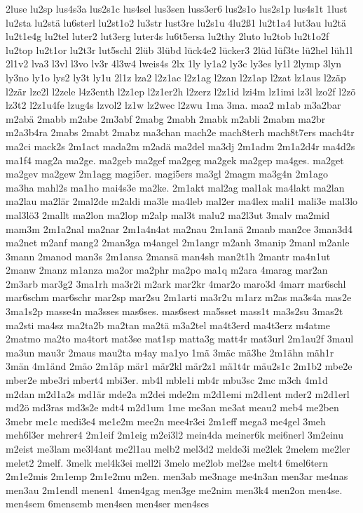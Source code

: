 {2luse
lu2sp
lus4s3a
lus2s1c
lus4sel
lus3sen
luss3er6
lus2s1o
lus2s1p
lus4s1t
1lust
lu2sta
lu2stä
lu6sterl
lu2st1o2
lu3str
lust3re
lu2s1u
4lu2ß1
lu2t1a4
lut3au
lu2tä
lu2t1e4g
lu2tel
luter2
lut3erg
luter4s
lu6t5ersa
lu2thy
2luto
lu2tob
lu2t1o2f
lu2top
lu2t1or
lu2t3r
lut5schl
2lüb
3lübd
lück4e2
lücker3
2lüd
lüf3te
lü2hel
lüh1l
2l1v2
lva3
l3vl
l3vo
lv3r
4l3w4
lweis4s
2lx
1ly
ly1a2
ly3c
ly3es
ly1l
2lymp
3lyn
ly3no
ly1o
lys2
ly3t
ly1u
2l1z
lza2
l2z1ac
l2z1ag
l2zan
l2z1ap
l2zat
lz1aus
l2zäp
l2zär
lze2l
l2zele
l4z3enth
l2z1ep
l2z1er2h
l2zerz
l2z1id
lzi4m
lz1imi
lz3l
lzo2f
l2zö
lz3t2
l2z1u4fe
lzug4s
lzvol2
lz1w
lz2wec
l2zwu
1ma
3ma.
maa2
m1ab
m3a2bar
m2abä
2mabb
m2abe
2m3abf
2mabg
2mabh
2mabk
m2abli
2mabm
ma2br
m2a3b4ra
2mabs
2mabt
2mabz
ma3chan
mach2e
mach8terh
mach8t7ers
mach4tr
ma2ci
mack2s
2m1act
mada2m
m2adä
ma2del
ma3dj
2m1adm
2m1a2d4r
ma4d2s
ma1f4
mag2a
ma2ge.
ma2geb
ma2gef
ma2geg
ma2gek
ma2gep
ma4ges.
ma2get
ma2gev
ma2gew
2m1agg
magi5er.
magi5ers
ma3gl
2magm
ma3g4n
2m1ago
ma3ha
mahl2s
ma1ho
mai4s3e
ma2ke.
2m1akt
mal2ag
mal1ak
ma4lakt
ma2lan
ma2lau
ma2lär
2mal2de
m2aldi
ma3le
ma4leb
mal2er
ma4lex
mali1
mali3e
mal3lo
mal3lö3
2mallt
ma2lon
ma2lop
m2alp
mal3t
malu2
ma2l3ut
3malv
ma2mid
mam3m
2m1a2nal
ma2nar
2m1a4n4at
ma2nau
2m1anä
2manb
man2ce
3man3d4
ma2net
m2anf
mang2
2man3ga
m4angel
2m1angr
m2anh
3manip
2manl
m2anle
3mann
2manod
man3s
2m1ansa
2mansä
man4sh
man2t1h
2mantr
ma4n1ut
2manw
2manz
m1anza
ma2or
ma2phr
ma2po
ma1q
m2ara
4marag
mar2an
2m3arb
mar3g2
3ma1rh
ma3r2i
m2ark
mar2kr
4mar2o
maro3d
4marr
mar6schl
mar6schm
mar6schr
mar2sp
mar2su
2m1arti
ma3r2u
m1arz
m2as
ma3s4a
mas2e
3ma1s2p
masse4n
ma3sses
mas6ses.
mas6sest
ma5sset
mass1t
ma3s2su
3mas2t
ma2sti
ma4sz
ma2ta2b
ma2tan
ma2tä
m3a2tel
ma4t3erd
ma4t3erz
m4atme
2matmo
ma2to
ma4tort
mat3se
mat1sp
matta3g
matt4r
mat3url
2m1au2f
3maul
ma3un
mau3r
2maus
mau2ta
m4ay
ma1yo
1mä
3mäc
mä3he
2m1ähn
mäh1r
3män
4m1änd
2mäo
2m1äp
mär1
mär2kl
mär2z1
mä1t4r
mäu2s1c
2m1b2
mbe2e
mber2e
mbe3ri
mbert4
mbi3er.
mb4l
mble1i
mb4r
mbu3sc
2mc
m3ch
4m1d
m2dan
m2d1a2s
md1är
mde2a
m2dei
mde2m
m2d1emi
m2d1ent
mder2
m2d1erl
md2ö
md3ras
md3s2e
mdt4
m2d1um
1me
me3an
me3at
meau2
meb4
me2ben
3mebr
me1c
medi3e4
me1e2m
mee2n
mee4r3ei
2m1eff
mega3
me4gel
3meh
meh6l3er
mehrer4
2m1eif
2m1eig
m2ei3l2
mein4da
meiner6k
mei6nerl
3m2einu
m2eist
me3lam
me3l4ant
me2l1au
melb2
mel3d2
melde3i
me2lek
2melem
me2ler
melet2
2melf.
3melk
mel4k3ei
mell2i
3melo
me2lob
mel2se
melt4
6mel6tern
2m1e2mis
2m1emp
2m1e2mu
m2en.
men3ab
me3nage
me4n3an
men3ar
me4nas
men3au
2m1endl
menen1
4men4gag
men3ge
me2nim
men3k4
men2on
men4se.
men4sem
6mensemb
men4sen
men4ser
men4ses
}
